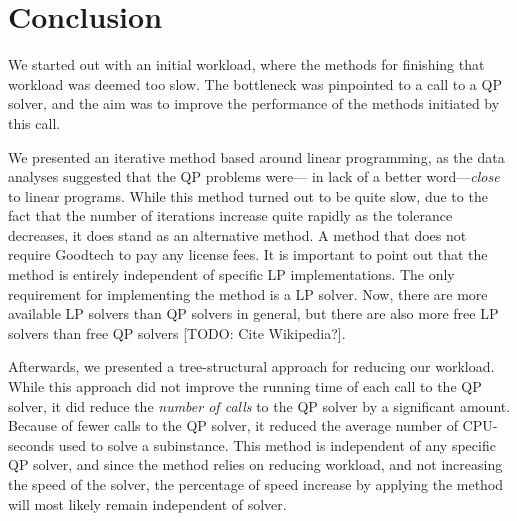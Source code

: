 \documentclass[a4paper,12pt]{report}
\begin{document}
\chapter{Conclusion}
We started out with an initial workload, where the methods for finishing
that workload was deemed too slow. The bottleneck was pinpointed to a call
to a QP solver, and the aim was to improve the performance of the methods
initiated by this call.

We presented an iterative method based around linear programming, as the data
analyses suggested that the QP problems were--- in lack of a better
word---\emph{close} to linear programs. While this method turned out to be
quite slow, due to the fact that the number of iterations increase quite
rapidly as the tolerance decreases, it does stand as an alternative method. A
method that does not require Goodtech to pay any license fees. It is important
to point out that the method is entirely independent of specific LP
implementations. The only requirement for implementing the method is a LP
solver. Now, there are more available LP solvers than QP solvers in general,
but there are also more free LP solvers than free QP solvers [TODO: Cite 
Wikipedia?].

Afterwards, we presented a tree-structural approach for reducing our workload.
While this approach did not improve the running time of each call to the QP
solver, it did reduce the \emph{number of calls} to the QP solver by a
significant amount. Because of fewer calls to the QP solver, it reduced the
average number of CPU-seconds used to solve a subinstance. This method is
independent of any specific QP solver, and since the method relies on reducing
workload, and not increasing the speed of the solver, the percentage of speed
increase by applying the method will most likely remain independent of solver.


{}


\onecolumn

\end{document}
